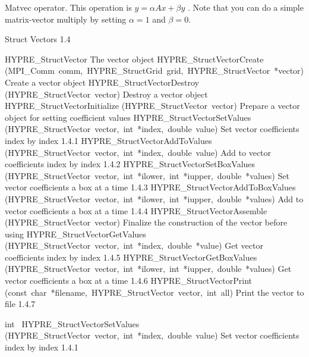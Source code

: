 \documentclass{article}
\begin{document}
\begin{cxxentry}
\begin{cxxentry}
\begin{cxxfunction}
\begin{cxxdoc}
Matvec operator.  This operation is  $y = \alpha A x + \beta y$ .
Note that you can do a simple matrix-vector multiply by setting
$\alpha=1$ and $\beta=0$.
\end{cxxdoc}
\end{cxxfunction}
\end{cxxentry}
\begin{cxxentry}
{}
        {Struct Vectors}
        {}
        {
}
        {1.4}
\begin{cxxnames}
        {HYPRE\_StructVector}
        {}
        {
The vector object}
        {}
\label{cxx.1.4.8}
        {HYPRE\_StructVectorCreate}
        {(MPI\_Comm\ comm,\ HYPRE\_StructGrid\ grid,\ HYPRE\_StructVector\ *vector)}
        {
Create a vector object}
        {}
\label{cxx.1.4.9}
        {HYPRE\_StructVectorDestroy}
        {(HYPRE\_StructVector\ vector)}
        {
Destroy a vector object}
        {}
\label{cxx.1.4.10}
        {HYPRE\_StructVectorInitialize}
        {(HYPRE\_StructVector\ vector)}
        {
Prepare a vector object for setting coefficient values}
        {}
\label{cxx.1.4.11}
        {HYPRE\_StructVectorSetValues}
        {(HYPRE\_StructVector\ vector,\ int\ *index,\ double\ value)}
        {
Set vector coefficients index by index}
        {1.4.1}
        {HYPRE\_StructVectorAddToValues}
        {(HYPRE\_StructVector\ vector,\ int\ *index,\ double\ value)}
        {
Add to vector coefficients index by index}
        {1.4.2}
        {HYPRE\_StructVectorSetBoxValues}
        {(HYPRE\_StructVector\ vector,\ int\ *ilower,\ int\ *iupper,\ double\ *values)}
        {
Set vector coefficients a box at a time}
        {1.4.3}
        {HYPRE\_StructVectorAddToBoxValues}
        {(HYPRE\_StructVector\ vector,\ int\ *ilower,\ int\ *iupper,\ double\ *values)}
        {
Add to vector coefficients a box at a time}
        {1.4.4}
        {HYPRE\_StructVectorAssemble}
        {(HYPRE\_StructVector\ vector)}
        {
Finalize the construction of the vector before using}
        {}
\label{cxx.1.4.12}
        {HYPRE\_StructVectorGetValues}
        {(HYPRE\_StructVector\ vector,\ int\ *index,\ double\ *value)}
        {
Get vector coefficients index by index}
        {1.4.5}
        {HYPRE\_StructVectorGetBoxValues}
        {(HYPRE\_StructVector\ vector,\ int\ *ilower,\ int\ *iupper,\ double\ *values)}
        {
Get vector coefficients a box at a time}
        {1.4.6}
        {HYPRE\_StructVectorPrint}
        {(const\ char\ *filename,\ HYPRE\_StructVector\ vector,\ int\ all)}
        {
Print the vector to file}
        {1.4.7}
\end{cxxnames}
\begin{cxxfunction}
{int\ }
        {HYPRE\_StructVectorSetValues}
        {(HYPRE\_StructVector\ vector,\ int\ *index,\ double\ value)}
        {
Set vector coefficients index by index}
        {1.4.1}
\begin{cxxdoc}


\end{cxxdoc}
\end{cxxfunction}
\end{cxxentry}
\end{cxxentry}
\end{document}
